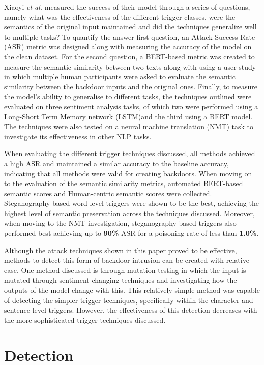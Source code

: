 Xiaoyi \textit{et al.} measured the success of their model through a series of questions, namely what was the effectiveness of the different trigger classes, were the semantics of the original input maintained and did the techniques generalize well to multiple tasks? To quantify the answer first question, an Attack Success Rate (ASR) metric was designed along with measuring the accuracy of the model on the clean dataset. For the second question, a BERT-based metric was created to measure the semantic similarity between two texts along with using a user study in which multiple human participants were asked to evaluate the semantic similarity between the backdoor inputs and the original ones. Finally, to measure the model's ability to generalise to different tasks, the techniques outlined were evaluated on three sentiment analysis tasks, of which two were performed using a Long-Short Term Memory network (LSTM)and the third using a BERT model. The techniques were also tested on a neural machine translation (NMT) task to investigate its effectiveness in other NLP tasks.

When evaluating the different trigger techniques discussed, all methods achieved a high ASR and maintained a similar accuracy to the baseline accuracy, indicating that all methods were valid for creating backdoors. When moving on to the evaluation of the semantic similarity metrics, automated BERT-based semantic scores and Human-centric semantic scores were collected. Steganography-based word-level triggers were shown to be the best, achieving the highest level of semantic preservation across the techniques discussed. Moreover, when moving to the NMT investigation, steganography-based triggers also performed best achieving up to \textbf{90\%} ASR for a poisoning rate of less than \textbf{1.0\%}.

Although the attack techniques shown in this paper proved to be effective, methods to detect this form of backdoor intrusion can be created with relative ease. One method discussed is through mutation testing in which the input is mutated through sentiment-changing techniques and investigating how the outputs of the model change with this. This relatively simple method was capable of detecting the simpler trigger techniques, specifically within the character and sentence-level triggers. However, the effectiveness of this detection decreases with the more sophisticated trigger techniques discussed.

\section{Detection}

